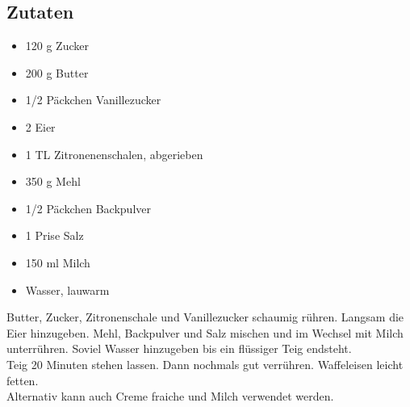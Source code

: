 \documentclass{article}
\begin{document}
\subsection*{Zutaten} %
\label{sub:zutaten}
	\begin{itemize}
		\item 120 g Zucker
		\item 200 g Butter
		\item 1/2 Päckchen Vanillezucker
		\item 2 Eier
		\item 1 TL Zitronenenschalen, abgerieben
		\item 350 g Mehl
		\item 1/2 Päckchen Backpulver
		\item 1 Prise Salz
		\item 150 ml Milch
		\item Wasser, lauwarm
	\end{itemize}
Butter, Zucker, Zitronenschale und Vanillezucker schaumig rühren.
Langsam die Eier hinzugeben. Mehl, Backpulver und Salz mischen und im Wechsel mit Milch 
unterrühren. Soviel Wasser hinzugeben bis ein flüssiger Teig endsteht.\\

Teig 20 Minuten stehen lassen. Dann nochmals gut verrühren. Waffeleisen leicht fetten.\\

Alternativ kann auch Creme fraiche und Milch verwendet werden.
\end{document}
